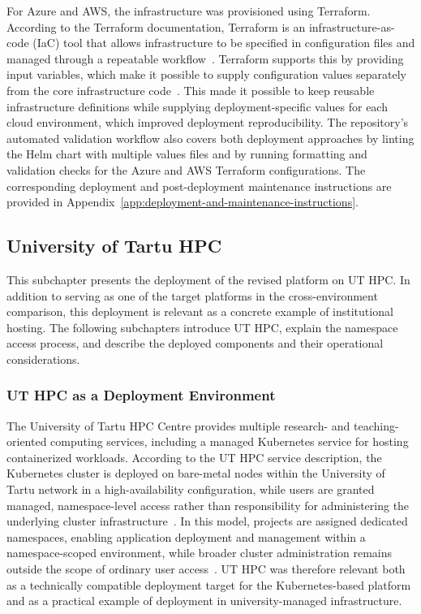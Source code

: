 For Azure and AWS, the infrastructure was provisioned using Terraform.
According to the Terraform documentation, Terraform is an infrastructure-as-code (IaC) tool that allows infrastructure to be specified in configuration files and managed through a repeatable workflow~\cite{hashicorp_terraform_intro}.
Terraform supports this by providing input variables, which make it possible to supply configuration values separately from the core infrastructure code~\cite{hashicorp_terraform_input_variables}.
This made it possible to keep reusable infrastructure definitions while supplying deployment-specific values for each cloud environment, which improved deployment reproducibility.
The repository's automated validation workflow also covers both deployment approaches by linting the Helm chart with multiple values files and by running formatting and validation checks for the Azure and AWS Terraform configurations.
The corresponding deployment and post-deployment maintenance instructions are provided in Appendix~\ref{app:deployment-and-maintenance-instructions}.

\subsection{University of Tartu HPC} \label{subsec:university-of-tartu-hpc}
This subchapter presents the deployment of the revised platform on UT HPC\@.
In addition to serving as one of the target platforms in the cross-environment comparison, this deployment is relevant as a concrete example of institutional hosting.
The following subchapters introduce UT HPC, explain the namespace access process, and describe the deployed components and their operational considerations.

\subsubsection{UT HPC as a Deployment Environment} \label{subsubsec:ut-hpc-as-a-deployment-environment}
The University of Tartu HPC Centre provides multiple research- and teaching-oriented computing services, including a managed Kubernetes service for hosting containerized workloads.
According to the UT HPC service description, the Kubernetes cluster is deployed on bare-metal nodes within the University of Tartu network in a high-availability configuration, while users are granted managed, namespace-level access rather than responsibility for administering the underlying cluster infrastructure~\cite{ut_hpc_kubernetes}.
In this model, projects are assigned dedicated namespaces, enabling application deployment and management within a namespace-scoped environment, while broader cluster administration remains outside the scope of ordinary user access~\cite{ut_hpc_kubernetes_quick_start_2026}.
UT HPC was therefore relevant both as a technically compatible deployment target for the Kubernetes-based platform and as a practical example of deployment in university-managed infrastructure.

